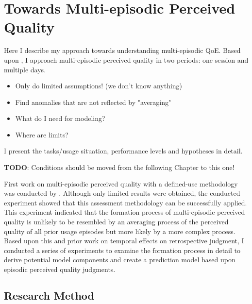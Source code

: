 \chapter{Towards Multi-episodic Perceived Quality}\label{chap:towards}

\begin{chapter-abstract}
Here I describe my approach towards understanding multi-episodic \ac{QoE}.
Based upon \citet{moller_single-call_2011}, I approach multi-episodic perceived quality in two periods: one session and multiple days.

\begin{itemize}
\item Only do limited assumptions! (we don't know anything)
\item Find anomalies that are not reflected by "averaging"
\item What do I need for modeling?
\item Where are limits?
\end{itemize}

I present the tasks/usage situation, performance levels and hypotheses in detail.

\textbf{TODO}: Conditions should be moved from the following Chapter to this one!
\end{chapter-abstract}

First work on multi-episodic perceived quality with a defined-use methodology was conducted by \citet{moller_single-call_2011}.
Although only limited results were obtained, the conducted experiment showed that this assessment methodology can be successfully applied.
This experiment indicated that the formation process of multi-episodic perceived quality is unlikely to be resembled by an averaging process of the perceived quality of all prior usage episodes but more likely by a more complex process.
Based upon this and prior work on temporal effects on retrospective judgment, I conducted a series of experiments to examine the formation process in detail to derive potential model components and create a prediction model based upon episodic perceived quality judgments.

\section{Research Method}
